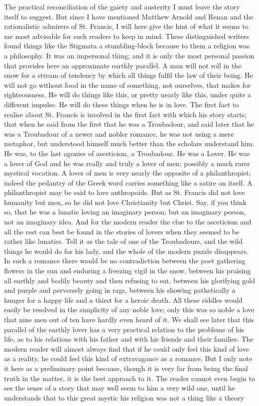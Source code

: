 \documentclass{book}
\begin{document}
The practical reconciliation of the gaiety and austerity I must leave the story itself to suggest. But since I have mentioned Matthew Arnold and Renan and the rationalistic admirers of St. Francis, I will here give the hint of what it seems to me most advisable for such readers to keep in mind. These distinguished writers found things like the Stigmata a stumbling-block because to them a religion was a philosophy. It was an impersonal thing; and it is only the most personal passion that provides here an approximate earthly parallel. A man will not roll in the snow for a stream of tendency by which all things fulfil the law of their being. He will not go without food in the name of something, not ourselves, that makes for righteousness. He will do things like this, or pretty nearly like this, under quite a different impulse. He will do these things when he is in love. The first fact to realise about St. Francis is involved in the first fact with which his story starts; that when he said from the first that he was a Troubadour, and said later that he was a Troubadour of a newer and nobler romance, he was not using a mere metaphor, but understood himself much better than the scholars understand him. He was, to the last agonies of asceticism, a Troubadour. He was a Lover. He was a lover of God and he was really and truly a lover of men; possibly a much rarer mystical vocation. A lover of men is very nearly the opposite of a philanthropist; indeed the pedantry of the Greek word carries something like a satire on itself. A philanthropist may be said to love anthropoids. But as St. Francis did not love humanity but men, so he did not love Christianity but Christ. Say, if you think so, that he was a lunatic loving an imaginary person; but an imaginary person, not an imaginary idea. And for the modern reader the clue to the asceticism and all the rest can best be found in the stories of lovers when they seemed to be rather like lunatics. Tell it as the tale of one of the Troubadours, and the wild things he would do for his lady, and the whole of the modern puzzle disappears. In such a romance there would be no contradiction between the poet gathering flowers in the sun and enduring a freezing vigil in the snow, between his praising all earthly and bodily beauty and then refusing to eat, between his glorifying gold and purple and perversely going in rags, between his showing pathetically a hunger for a happy life and a thirst for a heroic death. All these riddles would easily be resolved in the simplicity of any noble love; only this was so noble a love that nine men out of ten have hardly even heard of it. We shall see later that this parallel of the earthly lover has a very practical relation to the problems of his life, as to his relations with his father and with his friends and their families. The modern reader will almost always find that if he could only feel this kind of love as a reality, he could feel this kind of extravagance as a romance. But I only note it here as a preliminary point because, though it is very far from being the final truth in the matter, it is the best approach to it. The reader cannot even begin to see the sense of a story that may well seem to him a very wild one, until he understands that to this great mystic his religion was not a thing like a theory 
\end{document}
